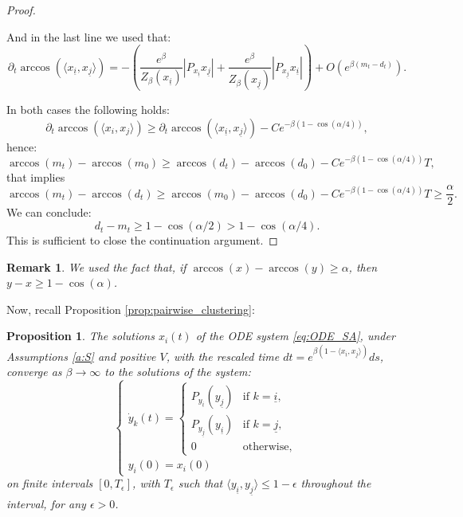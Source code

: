 \documentclass{article}
\numberwithin{theorem}{section}
\newtheorem{proposition}[theorem]{Proposition}
\newtheorem{remark}[theorem]{Remark}
\begin{document}
\begin{proof}
\begin{itemize}
And in the last line we used that: 
$$
\partial_t \arccos(\langle x_{\underline{i}}, x_{\underline{j}}\rangle) = -\left(\frac{e^{\beta}}{Z_\beta(x_{\underline{i}})}  |P_{x_{\underline{i}}}x_{\underline{j}}|+\frac{e^{\beta}}{Z_\beta(x_{\underline{j}})}  |P_{x_{\underline{j}}}x_{\underline{i}}|\right)+O(e^{\beta(m_t-d_t)}).
$$
\end{itemize}
In both cases the following holds:
$$
\partial_t \arccos(\langle x_i, x_j\rangle) \geq \partial_t \arccos(\langle x_{\underline{i}}, x_{\underline{j}}\rangle)-Ce^{-\beta(1-\cos(\alpha/4))},
$$
hence:
$$
\arccos(m_t) - \arccos(m_0)\geq \arccos(d_t)-\arccos(d_0)-Ce^{-\beta(1-\cos(\alpha/4))}T,
$$
that implies
$$
\arccos(m_t) - \arccos(d_t)\geq\arccos(m_0) -\arccos(d_0)-Ce^{-\beta(1-\cos(\alpha/4))}T\geq\frac{\alpha}{2}.
$$
We can conclude:
$$
d_t- m_t\geq 1-\cos(\alpha/2)>1-\cos(\alpha/4).
$$
This is sufficient to close the continuation argument.
\end{proof}

\begin{remark}
    We used the fact that, if $\arccos(x)-\arccos(y)\geq\alpha$, then $y-x\geq 1-\cos(\alpha)$.
\end{remark} 

Now, recall Proposition \ref{prop:pairwise_clustering}:

\begin{proposition}
The solutions $x_i(t)$ of the ODE system \eqref{eq:ODE_SA}, under Assumptions \ref{a:S} and positive $V$, with the rescaled time $dt = e^{\beta(1 - \langle x_{\underline{i}}, x_{\underline{j}} \rangle)} ds$, converge as $\beta \to \infty$ to the solutions of the system:
\[
\begin{cases}
\dot{y}_k(t) = 
\begin{cases} 
P_{y_{\underline{i}}}(y_{\underline{j}}) & \text{if } k = \underline{i}, \\
P_{y_{\underline{j}}}(y_{\underline{i}}) & \text{if } k = \underline{j}, \\
0 & \text{otherwise},
\end{cases} \\
y_i(0) = x_i(0)
\end{cases}
\]
on finite intervals $[0, T_\epsilon]$, with $T_\epsilon$ such that $\langle y_{\underline{i}}, y_{\underline{j}} \rangle \leq 1 - \epsilon$ throughout the interval, for any $\epsilon > 0$.
\end{proposition}
\end{document}
